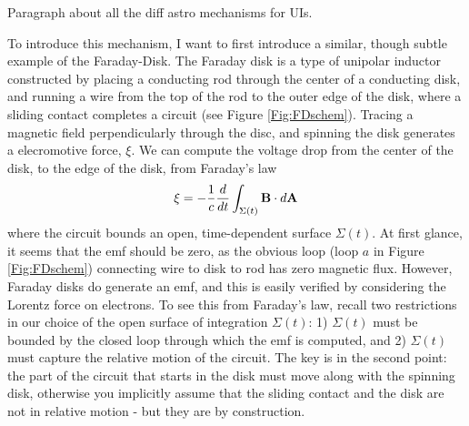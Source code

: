 Paragraph about all the diff astro mechanisms for UIs.

To introduce this mechanism, I want to first introduce a
similar, though subtle example of the Faraday-Disk. The Faraday disk is a type
of unipolar inductor constructed by placing a conducting rod through the
center of a conducting disk, and running a wire from the top of the rod to the
outer edge of the disk, where a sliding contact completes a circuit (see
Figure \ref{Fig:FDschem}). Tracing a magnetic field perpendicularly through the disc, and
spinning the disk generates a elecromotive force, $\xi$. We can compute the
voltage drop from the center of the disk, to the edge of the disk, from
Faraday's law 
\begin{align} 
\xi = - \frac{1}{c}\frac{d}{dt}\int_{\Sigma(t)}{{\bf B} \cdot d{\bf A}} 
\end{align} 
where the circuit bounds an open, time-dependent surface $\Sigma(t)$. At first
glance, it seems that the emf should be zero, as the obvious loop (loop $a$ in
Figure \ref{Fig:FDschem}) connecting wire to disk to rod has zero magnetic
flux. However, Faraday disks do generate an emf, and this is easily verified
by considering the Lorentz force on electrons. To see this from Faraday's law, recall two restrictions in our
choice of the open surface of integration $\Sigma(t)$: 1) $\Sigma(t)$ must be bounded by the closed loop through which the emf is computed, and 2) $\Sigma(t)$ must capture the relative motion of the circuit.
The key is in the second point: the part of the circuit that starts in the
disk must move along with the spinning disk, otherwise you implicitly assume
that the sliding contact and the disk are not in relative motion - but they
are by construction.


